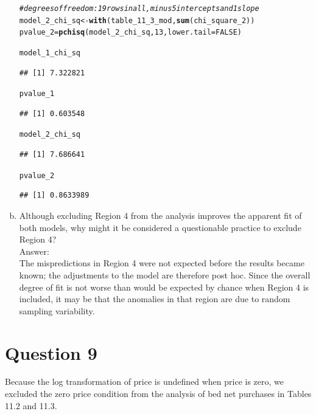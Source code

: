 \documentclass[11pt,notitlepage]{article}\usepackage[]{graphicx}\usepackage[]{color}
\makeatletter
\newcommand{\hlnum}[1]{\textcolor[rgb]{0.686,0.059,0.569}{#1}}%
\newcommand{\hlcom}[1]{\textcolor[rgb]{0.678,0.584,0.686}{\textit{#1}}}%
\newcommand{\hlstd}[1]{\textcolor[rgb]{0.345,0.345,0.345}{#1}}%
\newcommand{\hlkwb}[1]{\textcolor[rgb]{0.69,0.353,0.396}{#1}}%
\newcommand{\hlkwc}[1]{\textcolor[rgb]{0.333,0.667,0.333}{#1}}%
\newcommand{\hlkwd}[1]{\textcolor[rgb]{0.737,0.353,0.396}{\textbf{#1}}}%
\newenvironment{kframe}{%
 \def\at@end@of@kframe{}%
 \ifinner\ifhmode%
  \def\at@end@of@kframe{\end{minipage}}%
  \begin{minipage}{\columnwidth}%
 \fi\fi%
 \def\FrameCommand##1{\hskip\@totalleftmargin \hskip-\fboxsep
 \colorbox{shadecolor}{##1}\hskip-\fboxsep
     \hskip-\linewidth \hskip-\@totalleftmargin \hskip\columnwidth}%
 \MakeFramed {\advance\hsize-\width
   \@totalleftmargin\z@ \linewidth\hsize
   \@setminipage}}%
 {\par\unskip\endMakeFramed%
 \at@end@of@kframe}
\newenvironment{knitrout}{}{} %
\makeatother
\begin{document}
\begin{enumerate}[a)]
\begin{knitrout}
\begin{kframe}
\begin{alltt}
\hlcom{# degrees of freedom: 19 rows in all, minus 5 intercepts and 1 slope}
\hlstd{model_2_chi_sq} \hlkwb{<-} \hlkwd{with}\hlstd{(table_11_3_mod,} \hlkwd{sum}\hlstd{(chi_square_2))}
\hlstd{pvalue_2} \hlkwb{=} \hlkwd{pchisq}\hlstd{(model_2_chi_sq,} \hlnum{13}\hlstd{,} \hlkwc{lower.tail} \hlstd{=} \hlnum{FALSE}\hlstd{)}

\hlstd{model_1_chi_sq}
\end{alltt}
\begin{verbatim}
## [1] 7.322821
\end{verbatim}
\begin{alltt}
\hlstd{pvalue_1}
\end{alltt}
\begin{verbatim}
## [1] 0.603548
\end{verbatim}
\begin{alltt}
\hlstd{model_2_chi_sq}
\end{alltt}
\begin{verbatim}
## [1] 7.686641
\end{verbatim}
\begin{alltt}
\hlstd{pvalue_2}
\end{alltt}
\begin{verbatim}
## [1] 0.8633989
\end{verbatim}
\end{kframe}
\end{knitrout}

\item Although excluding Region 4 from the analysis improves the apparent fit of both models, why might it be considered a questionable practice to exclude Region 4?\\
Answer:\\
The mispredictions in Region 4 were not expected before the results became known; the adjustments to the model are therefore post hoc. Since the overall degree of fit is not worse than would be expected by chance when Region 4 is included, it may be that the anomalies in that region are due to random sampling variability.
\end{enumerate}

\section*{Question 9}
Because the log transformation of price is undefined when price is zero, we excluded the zero price condition from the analysis of bed net purchases in Tables 11.2 and 11.3.
\end{document}
